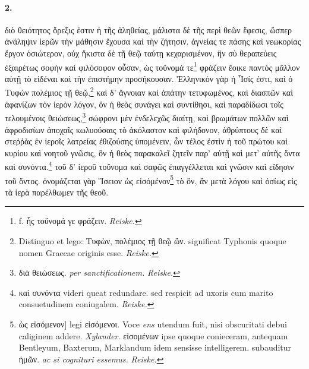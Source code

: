 \documentclass[a4paper, 11pt, oneside, polutonikogreek, german, landscape]{article}
\begin{document}
\paragraph{2.}
διὸ θειότητος ὄρεξις ἐστιν ἡ τῆς ἀληθείας, μάλιστα δὲ τῆς περὶ θεῶν ἔφεσις, ὥσπερ ἀνάληψιν ἱερῶν τὴν μάθησιν ἔχουσα καὶ τὴν ζήτησιν. ἁγνείας τε πάσης καὶ νεωκορίας ἔργον ὁσιώτερον, οὐχ ἥκιστα δὲ τῇ θεῷ ταύτῃ κεχαρισμένον, ἣν σὺ θεραπεύεις ἐξαιρέτως σοφὴν καὶ φιλόσοφον οὖσαν, ὡς τοὔνομά τε\footnote{f. ἧς τοὔνομά γε φράζειν. \emph{Reiske.}} φράζειν ἔοικε παντὸς μᾶλλον αὐτῇ τὸ εἰδέναι καὶ τὴν ἐπιστήμην προσήκουσαν. Ἑλληνικὸν γὰρ ἡ Ἶσίς ἐστι, καὶ ὁ Τυφὼν πολέμιος τῇ θεῷ,\footnote{Distinguo et lego: Τυφὼν, πολέμιος τῇ θεῷ ὢν. significat Typhonis quoque nomen Graecae originis esse. \emph{Reiske.}} καὶ δ' ἄγνοιαν καὶ ἀπάτην τετυφωμένος, καὶ διασπῶν καὶ ἀφανίζων τὸν ἱερὸν λόγον, ὃν ἡ θεὸς συνάγει καὶ συντίθησι, καὶ παραδίδωσι τοῖς τελουμένοις θειώσεως,\footnote{διὰ θειώσεως. \emph{per sanctificationem.} \emph{Reiske.}} σώφρονι μὲν ἐνδελεχῶς διαίτῃ, καὶ βρωμάτων πολλῶν καὶ ἀφροδισίων ἀποχαῖς κωλυούσαις τὸ ἀκόλαστον καὶ φιλήδονον, ἀθρύπτους δὲ καὶ στεῤῥὰς ἐν ἱεροῖς λατρείας ἐθιζούσης ὑπομένειν, ὧν τέλος ἐστὶν ἡ τοῦ πρώτου καὶ κυρίου καὶ νοητοῦ γνῶσις, ὃν ἡ θεὸς παρακαλεῖ ζητεῖν παρ' αὐτῇ καὶ μετ' αὐτῆς ὄντα καὶ συνόντα.\footnote{καὶ συνόντα videri queat redundare. sed respicit ad uxoris cum marito consuetudinem coniugalem. \emph{Reiske.}} τοῦ δ' ἱεροῦ τοὔνομα καὶ σαφῶς ἐπαγγέλλεται καὶ γνῶσιν καὶ εἴδησιν τοῦ ὄντος. ὀνομάζεται γὰρ Ἴσειον ὡς εἰσόμένον\footnote{ὡς εἰσόμενον] legi εἰσόμενοι. Voce \emph{ens} utendum fuit, nisi obscuritati debui caliginem addere. \emph{Xylander.} εἰσομένων ipse quoque conieceram, antequam Bentleyum, Baxterum, Marklandum idem sensisse intelligerem. subauditur ἡμῶν. \emph{ac si cognituri essemus.} \emph{Reiske.}} τὸ ὂν, ἂν μετὰ λόγου καὶ ὁσίως εἰς τὰ ἱερὰ παρέλθωμεν τῆς θεοῦ.
\end{document}
